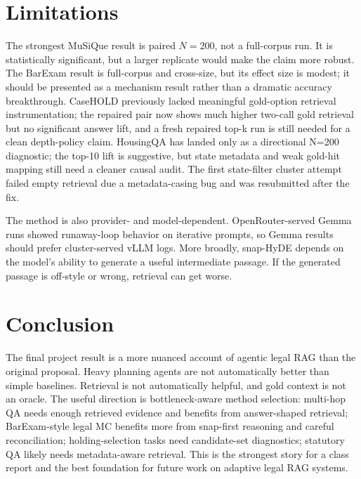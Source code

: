 \documentclass{article}
\begin{document}
\section{Limitations}

The strongest MuSiQue result is paired $N=200$, not a full-corpus run. It is
statistically significant, but a larger replicate would make the claim more
robust. The BarExam result is full-corpus and cross-size, but its effect size
is modest; it should be presented as a mechanism result rather than a dramatic
accuracy breakthrough. CaseHOLD previously lacked meaningful gold-option
retrieval instrumentation; the repaired pair now shows much higher two-call
gold retrieval but no significant answer lift, and a fresh repaired top-k run
is still needed for a clean depth-policy claim. HousingQA has landed only as a
directional N=200 diagnostic; the top-10 lift is suggestive, but state metadata
and weak gold-hit mapping still need a cleaner causal audit. The first
state-filter cluster attempt failed empty retrieval due a metadata-casing bug
and was resubmitted after the fix.

The method is also provider- and model-dependent. OpenRouter-served Gemma runs
showed runaway-loop behavior on iterative prompts, so Gemma results should
prefer cluster-served vLLM logs. More broadly, snap-HyDE depends on the model's
ability to generate a useful intermediate passage. If the generated passage is
off-style or wrong, retrieval can get worse.

\section{Conclusion}

The final project result is a more nuanced account of agentic legal RAG than
the original proposal. Heavy planning agents are not automatically better than
simple baselines. Retrieval is not automatically helpful, and gold context is
not an oracle. The useful direction is bottleneck-aware method selection:
multi-hop QA needs enough retrieved evidence and benefits from answer-shaped
retrieval; BarExam-style legal MC benefits more from snap-first reasoning and
careful reconciliation; holding-selection tasks need candidate-set diagnostics;
statutory QA likely needs metadata-aware retrieval. This is the strongest
story for a class report and the best foundation for future work on adaptive
legal RAG systems.
\end{document}
